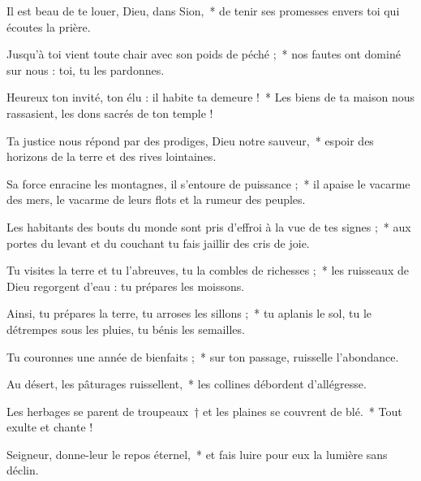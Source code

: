 \item Il est beau de te louer, Dieu, dans Sion,~* de tenir ses promesses envers toi qui écoutes la prière.

\item Jusqu'à toi vient toute chair avec son poids de péché ;~* nos fautes ont dominé sur nous : toi, tu les pardonnes.

\item Heureux ton invité, ton élu : il habite ta demeure !~* Les biens de ta maison nous rassasient, les dons sacrés de ton temple !

\item Ta justice nous répond par des prodiges, Dieu notre sauveur,~* espoir des horizons de la terre et des rives lointaines.

\item Sa force enracine les montagnes, il s'entoure de puissance ;~* il apaise le vacarme des mers, le vacarme de leurs flots et la rumeur des peuples.

\item Les habitants des bouts du monde sont pris d'effroi à la vue de tes signes ;~* aux portes du levant et du couchant tu fais jaillir des cris de joie.

\item Tu visites la terre et tu l'abreuves, tu la combles de richesses ;~* les ruisseaux de Dieu regorgent d'eau : tu prépares les moissons. 

\item Ainsi, tu prépares la terre, tu arroses les sillons ;~* tu aplanis le sol, tu le détrempes sous les pluies, tu bénis les semailles.

\item Tu couronnes une année de bienfaits ;~* sur ton passage, ruisselle l'abondance.

\item Au désert, les pâturages ruissellent,~* les collines débordent d'allégresse.

\item Les herbages se parent de troupeaux~† et les plaines se couvrent de blé.~* Tout exulte et chante !

\item Seigneur, donne-leur le repos éternel,~* et fais luire pour eux la lumière sans déclin.